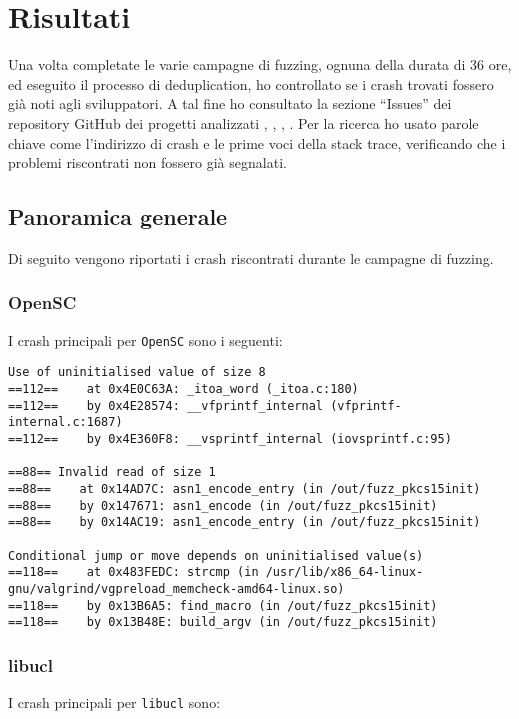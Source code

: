 
\chapter{Risultati}

Una volta completate le varie campagne di fuzzing, ognuna della durata di 36 ore, ed eseguito il processo di deduplication, ho controllato se i crash trovati fossero già noti agli sviluppatori. A tal fine ho consultato la sezione ``Issues'' dei repository GitHub dei progetti analizzati \cite{ref25}, \cite{ref26}, \cite{ref27}, \cite{ref28}.  
Per la ricerca ho usato parole chiave come l'indirizzo di crash e le prime voci della stack trace, verificando che i problemi riscontrati non fossero già segnalati.

\section{Panoramica generale}

Di seguito vengono riportati i crash riscontrati durante le campagne di fuzzing.

\subsection{OpenSC}
I crash principali per \texttt{OpenSC} sono i seguenti:

\begin{verbatim}
Use of uninitialised value of size 8
==112==    at 0x4E0C63A: _itoa_word (_itoa.c:180)
==112==    by 0x4E28574: __vfprintf_internal (vfprintf-internal.c:1687)
==112==    by 0x4E360F8: __vsprintf_internal (iovsprintf.c:95)

==88== Invalid read of size 1
==88==    at 0x14AD7C: asn1_encode_entry (in /out/fuzz_pkcs15init)
==88==    by 0x147671: asn1_encode (in /out/fuzz_pkcs15init)
==88==    by 0x14AC19: asn1_encode_entry (in /out/fuzz_pkcs15init)

Conditional jump or move depends on uninitialised value(s)
==118==    at 0x483FEDC: strcmp (in /usr/lib/x86_64-linux-gnu/valgrind/vgpreload_memcheck-amd64-linux.so)
==118==    by 0x13B6A5: find_macro (in /out/fuzz_pkcs15init)
==118==    by 0x13B48E: build_argv (in /out/fuzz_pkcs15init)
\end{verbatim}

\subsection{libucl}
I crash principali per \texttt{libucl} sono:

